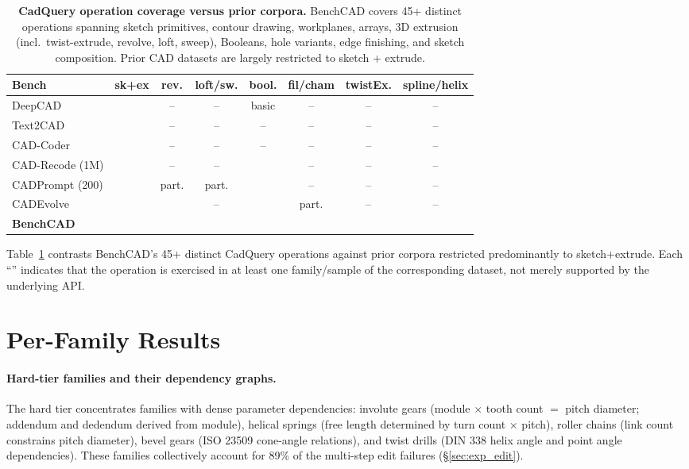 \documentclass{article}
\newcommand{\cmark}{\ding{51}}
\begin{document}
\begin{table}[t]
\centering
\small
\caption{\textbf{CadQuery operation coverage versus prior corpora.} BenchCAD covers 45+ distinct operations spanning sketch primitives, contour drawing, workplanes, arrays, 3D extrusion (incl.\ twist-extrude, revolve, loft, sweep), Booleans, hole variants, edge finishing, and sketch composition. Prior CAD datasets are largely restricted to sketch + extrude.}
\label{tab:op_coverage}
\begin{tabular}{lccccccc}
\toprule
Bench & sk+ex & rev. & loft/sw. & bool. & fil/cham & twistEx. & spline/helix \\
\midrule
DeepCAD              & \cmark & --     & --     & basic  & --     & --     & --     \\
Text2CAD             & \cmark & --     & --     & --     & --     & --     & --     \\
CAD-Coder            & \cmark & --     & --     & --     & --     & --     & --     \\
CAD-Recode (1M)      & \cmark & --     & --     & \cmark & --     & --     & --     \\
CADPrompt (200)      & \cmark & part.  & part.  & \cmark & --     & --     & --     \\
CADEvolve            & \cmark & \cmark & --     & \cmark & part.  & --     & --     \\
\midrule
\textbf{BenchCAD}    & \cmark & \cmark & \cmark & \cmark & \cmark & \cmark & \cmark \\
\bottomrule
\end{tabular}
\end{table}


Table~\ref{tab:op_coverage} contrasts BenchCAD's 45+ distinct CadQuery operations against prior corpora restricted predominantly to sketch+extrude. Each ``\cmark'' indicates that the operation is exercised in at least one family/sample of the corresponding dataset, not merely supported by the underlying API.

\section{Per-Family Results}
\label{app:full_results}

\paragraph{Hard-tier families and their dependency graphs.} The hard tier concentrates families with dense parameter dependencies: involute gears (module $\times$ tooth count $=$ pitch diameter; addendum and dedendum derived from module), helical springs (free length determined by turn count $\times$ pitch), roller chains (link count constrains pitch diameter), bevel gears (ISO 23509 cone-angle relations), and twist drills (DIN 338 helix angle and point angle dependencies). These families collectively account for 89\% of the multi-step edit failures (\S\ref{sec:exp_edit}).
\end{document}
